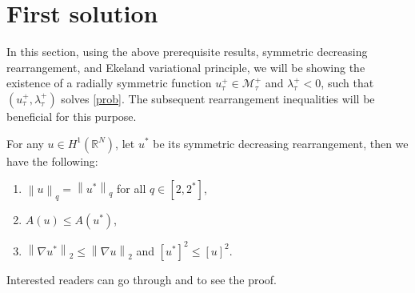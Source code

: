 \documentclass[11pt]{article}
\numberwithin{equation}{section}
\numberwithin{mytheorem}{section}
\begin{document}
		\section{First solution}
		In this section, using the above prerequisite results, symmetric decreasing rearrangement, and Ekeland variational principle, we will be showing the existence of a radially symmetric function $u_{\tau}^+\in \mathcal{M}_{\tau}^+$ and $\lambda_{\tau}^+<0$, such that $(u_{\tau}^+,\lambda_{\tau}^+)$ solves \eqref{prob}. The subsequent rearrangement inequalities will be beneficial for this purpose.
		\begin{remark}\label{Remark 3.1}
			For any $u\in H^1(\mathbb{R}^N)$, let $u^*$ be its symmetric decreasing rearrangement, then we have the following:
			\begin{enumerate}
				\item $\left\| u \right\|_q= \left\| u^*\right\|_q$ for all $q\in [2,2^*]$,
				\item $A(u)\leq A(u^*)$,
				\item $\left\| \nabla u^* \right\|_2\leq \left\| \nabla u \right\|_2$ and $[u^*]^2\leq [u]^2$.
			\end{enumerate}
		\end{remark}		
		\noindent Interested readers can go through \cite{Baernstein2019Symmetrization, Burchard2009Short, Lieb2001Analysis} and \cite[Remark~2.1]{Nidhi2025Normalized} to see the proof.
\end{document}
